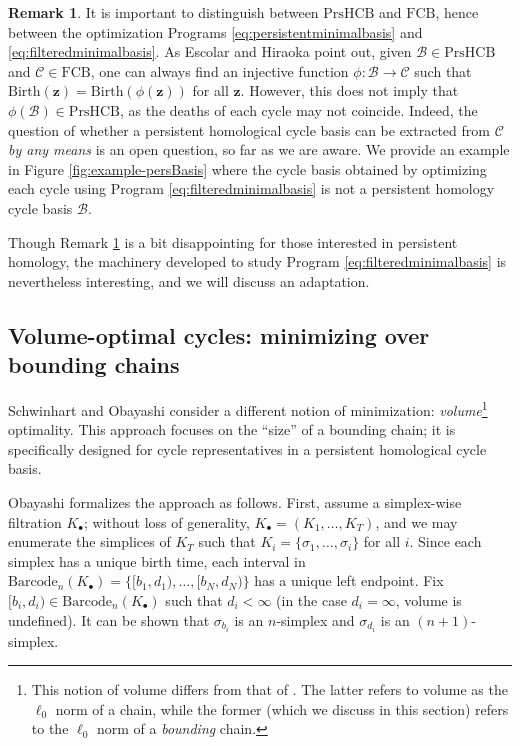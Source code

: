 \documentclass[utf8]{formatting_stuff/frontiersFPHY}
\newcommand{\cycle}{{\mathbf z}}
\newcommand{\fig}{Figure }
\newcommand{\birth}{\mathrm{Birth}}
\newcommand{\barcode}{\mathrm{Barcode}}
\newcommand{\fcyclebasis}{\mathcal{C}}
\newcommand{\setoffilteredcyclebases}{\mathrm{FCB}}
\newcommand{\setofpersistenthcyclebases}{\mathrm{PrsHCB}}
\newcommand{\pr}{Program }
\newcommand{\hcyclebasis}{\mathcal B}
\newcommand{\simplex}{\sigma}
\theoremstyle{plain}
\theoremstyle{definition}
\newtheorem{remark}[theorem]{Remark}
\begin{document}
\begin{remark}
\label{rmk:filteredversuspersistent}
It is important to distinguish between  $\setofpersistenthcyclebases$ and $\setoffilteredcyclebases$, hence between the optimization Programs \eqref{eq:persistentminimalbasis} and \eqref{eq:filteredminimalbasis}.  As Escolar and Hiraoka \cite{Escolar2016} point out, given $\hcyclebasis \in \setofpersistenthcyclebases$ and $\fcyclebasis \in \setoffilteredcyclebases$, one can always find an injective function $\phi: \hcyclebasis \to \fcyclebasis$ such that $\birth(\cycle) = \birth(\phi(\cycle))$ for all $\cycle$.  However, this does not imply that $\phi(\hcyclebasis) \in \setofpersistenthcyclebases$, as the deaths of each cycle may not coincide.  Indeed, the question of whether a persistent homological cycle basis can be extracted from $\fcyclebasis$ \emph{by any means} is an open question, so far as we are aware. We provide an example in \fig \ref{fig:example-persBasis} where the cycle basis obtained by optimizing each cycle using \pr \eqref{eq:filteredminimalbasis} is not a persistent homology cycle basis $\hcyclebasis$. 
\end{remark} 


Though Remark \ref{rmk:filteredversuspersistent} is a bit disappointing for those interested in persistent homology, the machinery developed to study \pr \eqref{eq:filteredminimalbasis} is nevertheless interesting, and we will discuss an adaptation.


\subsection{Volume-optimal cycles: minimizing over bounding chains}\label{sec:volume}

Schwinhart \cite{schweinhart2015statistical} and  Obayashi \cite{Obayashi2018} consider a different notion of minimization: \emph{volume}\footnote{This notion of volume differs from that of \cite{chenhardness}. The latter refers to volume as the $\ell_0$ norm of a chain, while the former (which we discuss in this section) refers to the $\ell_0$ norm of a \emph{bounding} chain.} optimality.  This approach focuses on the ``size'' of a bounding chain; it is specifically designed for cycle representatives in a persistent homological cycle basis.    


Obayashi \cite{Obayashi2018} formalizes the approach as follows.  First, assume a simplex-wise filtration $K_\bullet$; without loss of generality, $K_\bullet = (K_1, \ldots, K_T)$, and we may enumerate the simplices of $K_T$ such that $K_i = \{\simplex_1, \ldots, \simplex_i\}$ for all $i$.  Since each simplex has a unique birth time, each interval in  $\barcode_n(K_\bullet)= \{[b_1, d_1), \ldots, [b_N, d_N)\}$ has a unique left  endpoint.  Fix $[b_i,d_i) \in \barcode_n(K_\bullet)$ such that $d_i < \infty$ (in the case $d_i = \infty$, volume is undefined).    It can be shown that $\sigma_{b_i}$ is an $n$-simplex and  $\sigma_{d_i}$ is an $(n+1)$-simplex.
\end{document}
